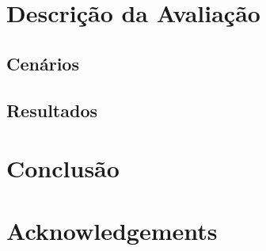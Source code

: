 \documentclass[a4paper, 12pt]{article}
\begin{document}
\section{Descrição da Avaliação}


\subsection{Cenários}


\subsection{Resultados}


\section{Conclusão}



%

\section{Acknowledgements}



% 



\end{document}
